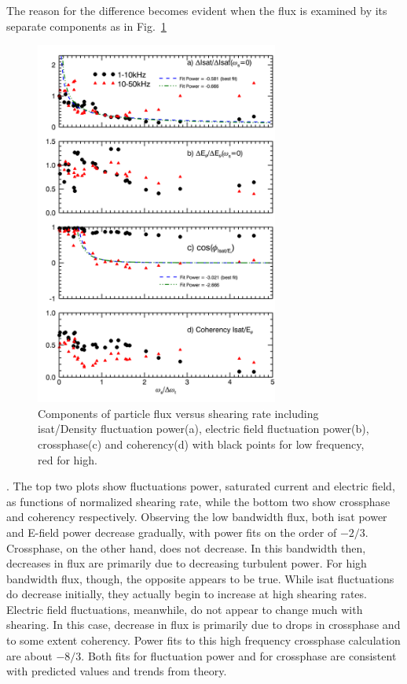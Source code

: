 \documentclass[%
 aip,
 amsmath,amssymb,
 preprint,%
]{revtex4-1}
\begin{document}
The reason for the difference becomes evident when the flux is examined by its separate components as in 
Fig.~\ref{fig:fluxcomps}
\begin{figure}
\begin{center}
\includegraphics[width=8cm]{fluxcomps.png}%
\end{center}
\caption{\label{fig:fluxcomps} Components of particle flux versus shearing rate including isat/Density fluctuation power(a), electric field fluctuation power(b), crossphase(c) and coherency(d) with black points for low frequency, red for high.}
\end{figure}
. The top two plots show fluctuations power, saturated current and electric field, as functions of normalized shearing rate, while the bottom two show crossphase and coherency respectively. Observing the low bandwidth flux, both isat power and E-field power decrease gradually, with power fits on the order of $-2/3$. Crossphase, on the other hand, does not decrease. In this bandwidth then, decreases in flux are primarily due to decreasing turbulent power. For high bandwidth flux, though, the opposite appears to be true. While isat fluctuations do decrease initially, they actually begin to increase at high shearing rates. Electric field fluctuations, meanwhile, do not appear to change much with shearing. In this case, decrease in flux is primarily due to drops in crossphase and to some extent coherency. Power fits to this high frequency crossphase calculation are about $-8/3$. Both fits for fluctuation power and for crossphase are consistent with predicted values and trends from theory.
\end{document}
